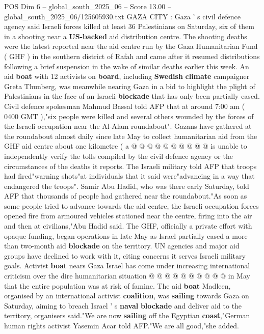 \begin{textsample}{POS Dim 6 – global\_south\_2025\_06 – Score 13.00 – global\_south\_2025\_06/125605930.txt}  \label{ex:f6_pos_017}
GAZA CITY : Gaza ' s civil defence agency said Israeli forces killed at least 36 Palestinians on Saturday, six of them in a shooting near a \textbf{US-backed} aid distribution centre.
The shooting deaths were the latest reported near the aid centre run by the Gaza Humanitarian Fund ( GHF ) in the southern district of Rafah and came after it resumed distributions following a brief suspension in the wake of similar deaths earlier this week.
An aid \textbf{boat} with 12 activists on \textbf{board}, including \textbf{Swedish} \textbf{climate} campaigner Greta Thunberg, was meanwhile nearing Gaza in a bid to highlight the plight of Palestinians in the face of an Israeli \textbf{blockade} that has only been partially eased.
Civil defence spokesman Mahmud Bassal told AFP that at around 7:00 am ( 0400 GMT ),"six people were killed and several others wounded by the forces of the Israeli occupation near the Al-Alam roundabout".
Gazans have gathered at the roundabout almost daily since late May to collect humanitarian aid from the GHF aid centre about one kilometre ( a @ @ @ @ @ @ @ @ @ @ is unable to independently verify the tolls compiled by the civil defence agency or the circumstances of the deaths it reports.
The Israeli military told AFP that troops had fired"warning shots"at individuals that it said were"advancing in a way that endangered the troops".
Samir Abu Hadid, who was there early Saturday, told AFP that thousands of people had gathered near the roundabout."As soon as some people tried to advance towards the aid centre, the Israeli occupation forces opened fire from armoured vehicles stationed near the centre, firing into the air and then at civilians,"Abu Hadid said.
The GHF, officially a private effort with opaque funding, began operations in late May as Israel partially eased a more than two-month aid \textbf{blockade} on the territory.
UN agencies and major aid groups have declined to work with it, citing concerns it serves Israeli military goals.
Activist \textbf{boat} nears Gaza Israel has come under increasing international criticism over the dire humanitarian situation @ @ @ @ @ @ @ @ @ @ in May that the entire population was at risk of famine.
The aid \textbf{boat} Madleen, organised by an international activist \textbf{coalition}, was \textbf{sailing} towards Gaza on Saturday, aiming to breach Israel ' s \textbf{naval} \textbf{blockade} and deliver aid to the territory, organisers said."We are now \textbf{sailing} off the Egyptian \textbf{coast},"German human rights activist Yasemin Acar told AFP."We are all good,"she added.

\end{textsample}
